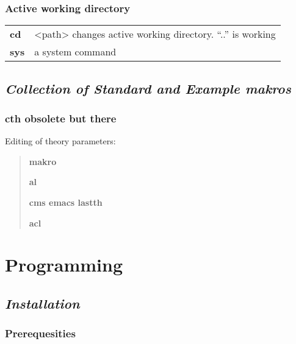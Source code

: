 \documentclass[]{article}
\begin{document}
\hypertarget{active-working-directory}{%
\subsubsection{Active working
directory}\label{active-working-directory}}

\begin{longtable}[]{@{}ll@{}}
\toprule
\endhead
\textbf{cd } & \textless{}path\textgreater{} changes active working
directory. ``..'' is working\tabularnewline
\textbf{sys} & a system command\tabularnewline
\bottomrule
\end{longtable}

\hypertarget{collection-of-standard-and-example-makros}{%
\subsection{\texorpdfstring{\emph{Collection of Standard and Example
makros}}{Collection of Standard and Example makros}}\label{collection-of-standard-and-example-makros}}

\hypertarget{cth-obsolete-but-there}{%
\subsubsection{cth obsolete but there }\label{cth-obsolete-but-there}}

Editing of theory parameters:

\begin{quote}
\textbf{makro}

\textbf{al}

\textbf{cms emacs lastth}

\textbf{acl}
\end{quote}

\hypertarget{programming}{%
\section{Programming}\label{programming}}

\hypertarget{installation}{%
\subsection{\texorpdfstring{\emph{Installation}}{Installation}}\label{installation}}

\hypertarget{prerequesities}{%
\subsubsection{Prerequesities}\label{prerequesities}}
\end{document}
